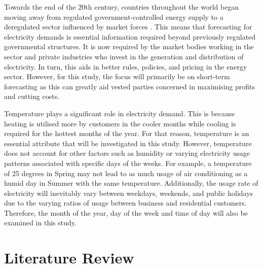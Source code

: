\documentclass[mstat,12pt]{unswthesis}
\begin{document}
Towards the end of the 20th century, countries throughout the world
began moving away from regulated government-controlled energy supply to
a deregulated sector influenced by market forces \cite{Catalao2007}.
This means that forecasting for electricity demands is essential
information required beyond previously regulated governmental
structures. It is now required by the market bodies working in the
sector and private industries who invest in the generation and
distribution of electricity. In turn, this aids in better rules,
policies, and pricing in the energy sector. However, for this study, the
focus will primarily be on short-term forecasting as this can greatly
aid vested parties concerned in maximising profits and cutting costs.

\bigskip

Temperature plays a significant role in electricity demand. This is
because heating is utilised more by customers in the cooler months while
cooling is required for the hottest months of the year. For that reason,
temperature is an essential attribute that will be investigated in this
study. However, temperature does not account for other factors such as
humidity or varying electricity usage patterns associated with specific
days of the weeks. For example, a temperature of 25 degrees in Spring
may not lead to as much usage of air conditioning as a humid day in
Summer with the same temperature. Additionally, the usage rate of
electricity will inevitably vary between weekdays, weekends, and public
holidays due to the varying ratios of usage between business and
residential customers. Therefore, the month of the year, day of the week
and time of day will also be examined in this study.

\hypertarget{literature-review}{%
\chapter{Literature Review}\label{literature-review}}
\end{document}
